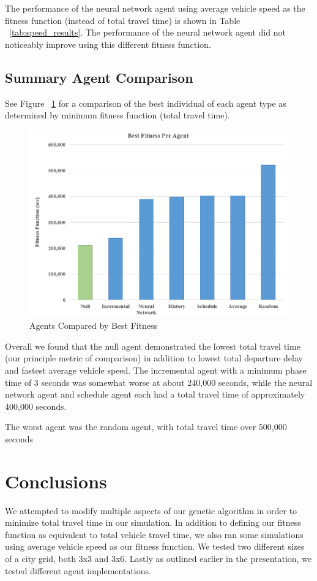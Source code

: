 \documentclass[twocolumn]{article}
\begin{document}
The performance of the neural network agent using average vehicle speed as the fitness function (instead of total travel time) is shown in Table ~\ref{tab:speed_results}. The performance of the neural network agent did not noticeably improve using this different fitness function.

\subsection{Summary Agent Comparison}

See Figure ~\ref{fig:agent_comparison} for a comparison of the best individual of each agent type as determined by minimum fitness function (total travel time). 

\begin{figure}[htp]
    \centering
    \includegraphics[width=\linewidth]{figures/agent_summary.PNG}
    \caption{Agents Compared by Best Fitness}
    \label{fig:agent_comparison}
\end{figure}

Overall we found that the null agent demonstrated the lowest total travel time (our principle metric of comparison) in addition to lowest total departure delay and fastest average vehicle speed. The incremental agent with a minimum phase time of 3 seconds was somewhat worse at about 240,000 seconds, while the neural network agent and schedule agent each had a total travel time of approximately 400,000 seconds.

The worst agent was the random agent, with total travel time over 500,000 seconds


\section{Conclusions} \label{conclusion_section}
We attempted to modify multiple aspects of our genetic algorithm in order to minimize total travel time in our simulation. In addition to defining our fitness function as equivalent to total vehicle travel time, we also ran some simulations using average vehicle speed as our fitness function. We tested two different sizes of a city grid, both 3x3 and 3x6. Lastly as outlined earlier in the presentation, we tested different agent implementations.
\end{document}
